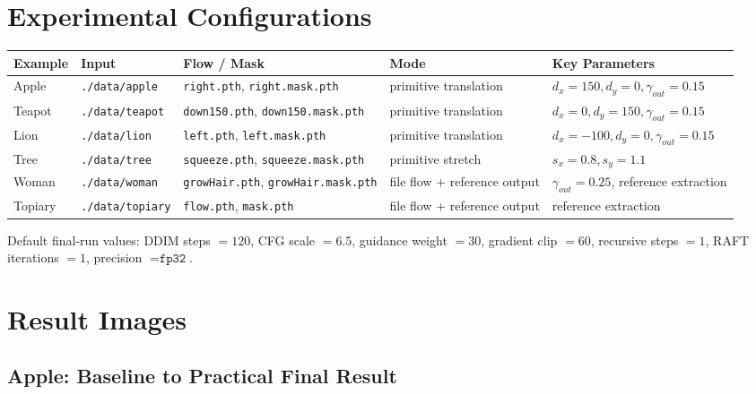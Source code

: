 \documentclass[11pt,a4paper]{article}
\begin{document}
\section{Experimental Configurations}

\small
\begin{tabularx}{\textwidth}{@{}lYYYY@{}}
\toprule
Example & Input & Flow / Mask & Mode & Key Parameters \\
\midrule
Apple & \texttt{./data/apple} & \texttt{right.pth}, \texttt{right.mask.pth} & primitive translation & \(d_x=150,d_y=0,\gamma_{out}=0.15\) \\
Teapot & \texttt{./data/teapot} & \texttt{down150.pth}, \texttt{down150.mask.pth} & primitive translation & \(d_x=0,d_y=150,\gamma_{out}=0.15\) \\
Lion & \texttt{./data/lion} & \texttt{left.pth}, \texttt{left.mask.pth} & primitive translation & \(d_x=-100,d_y=0,\gamma_{out}=0.15\) \\
Tree & \texttt{./data/tree} & \texttt{squeeze.pth}, \texttt{squeeze.mask.pth} & primitive stretch & \(s_x=0.8,s_y=1.1\) \\
Woman & \texttt{./data/woman} & \texttt{growHair.pth}, \texttt{growHair.mask.pth} & file flow + reference output & \(\gamma_{out}=0.25\), reference extraction \\
Topiary & \texttt{./data/topiary} & \texttt{flow.pth}, \texttt{mask.pth} & file flow + reference output & reference extraction \\
\bottomrule
\end{tabularx}
\normalsize

Default final-run values: DDIM steps \(=120\), CFG scale \(=6.5\), guidance weight \(=30\), gradient clip \(=60\), recursive steps \(=1\), RAFT iterations \(=1\), precision \(=\texttt{fp32}\).

\section{Result Images}

\subsection{Apple: Baseline to Practical Final Result}
\end{document}
